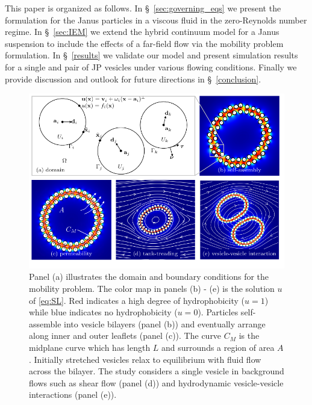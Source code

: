 \documentclass[lineno]{jfm}
\begin{document}
This paper is organized as follows. In \S~\ref{sec:governing_eqs} we
present the formulation for the Janus particles in a viscous fluid in
the zero-Reynolds number regime. In \S~\ref{sec:IEM} we extend the
hybrid continuum model for a Janus suspension to include the effects of
a far-field flow via the mobility problem formulation. In
\S~\ref{results} we validate our model and present simulation results
for a single and pair of JP vesicles under various flowing conditions.
Finally we provide discussion and outlook for future directions in
\S~\ref{conclusion}.

\begin{figure}
\begin{center}
\includegraphics[width=\textwidth]{Figure0_Wrapper.pdf}
\end{center}
\caption{Panel (a) illustrates the domain and boundary conditions for the mobility problem. 
The color map in panels (b) - (e) is the solution $u$ of \eqref{eq:SL}. Red indicates a high degree of hydrophobicity ($u = 1$) 
while blue indicates no hydrophobicity ($u = 0$).
Particles self-assemble into vesicle bilayers (panel (b)) and eventually  
arrange along inner and outer leaflets (panel (c)). The curve $C_M$ is the midplane curve which has 
length $L$ and surrounds a region of area $A$.  Initially stretched vesicles relax to equilibrium 
with fluid flow across the bilayer. The study considers a single vesicle in background flows such as shear flow (panel (d))
and hydrodynamic vesicle-vesicle interactions (panel (e)).}
\label{fig:figure0}
\end{figure}
\end{document}
